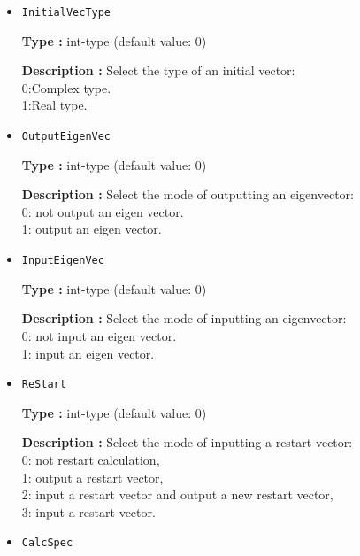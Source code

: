 \begin{itemize}
{\bf Type :} int-type (default value: 0)

{\bf Description :} Select the method to calculate eigenvectors:\\
0:Lanczos+CG methods (When the convergence of eigenvectors are not enough for using Lanczos method,  CG method is applied to calculate eigenvectors).\\
1:Lanczos method.\\

\item  \verb|InitialVecType|

{\bf Type :} int-type (default value: 0)

{\bf Description :} Select the type of an initial vector:\\
0:Complex type.\\
1:Real type.\\

\item  \verb|OutputEigenVec|

{\bf Type :} int-type (default value: 0)

{\bf Description :} {Select the mode of outputting an eigenvector:\\
0: not output an eigen vector.\\
1: output an eigen vector.\\
}

\item  \verb|InputEigenVec|

{\bf Type :} int-type (default value: 0)

{\bf Description :} {Select the mode of inputting an eigenvector:\\
0: not input an eigen vector.\\
1: input an eigen vector.\\
}

\item  \verb|ReStart|

{\bf Type :} {int-type (default value: 0)}

{\bf Description :} {
{
Select the mode of inputting a restart vector:\\
0:  not restart calculation,\\
1:  output a restart vector,\\
2:  input a restart vector and output a new restart vector,\\
3: input a restart vector.\\
}
}


\item  \verb|CalcSpec|


\end{itemize}
